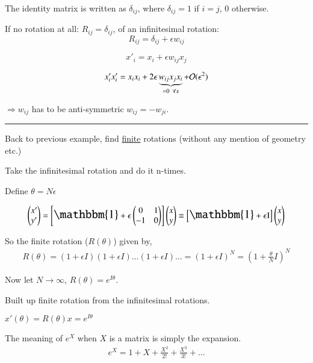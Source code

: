 {The identity matrix is written as $\delta_{ij}$, where $\delta_{ij} = 1$ if $i=j$, 0 otherwise.

If no rotation at all: $R_{ij} = \delta_{ij}$,  of an infinitesimal rotation:  
\begin{equation*}
R_{ij} = \delta_{ij} + \epsilon w_{ij}
\end{equation*}

\begin{equation*}
x'_{i} = x_i + \epsilon w_{ij} x_j
\end{equation*}


\begin{equation*}
x'_{i}x'_{i} = x_i x_{i} + 2 \epsilon \underbrace{w_{ij} x_j x_i}_{ =0 \hspace*{0.05in} \forall x }  + \mathcal{O}(\epsilon^2)
\end{equation*}

$\Rightarrow w_{ij}$ has to be anti-symmetric $w_{ij} = - w_{ji}$.

\noindent\rule{\textwidth}{1pt}

Back to previous example, find \underline{finite} rotations (without any mention of geometry etc.)

Take the infinitesimal rotation and do it n-times.

Define $\theta = N\epsilon$

\begin{eqnarray*}
\xyprime = \left[ \mathlarger{\mathlarger{\mathbbm{1}}} + \epsilon   \IMatrix \right]\xy \equiv \left[ \mathlarger{\mathlarger{\mathbbm{1}}} + \epsilon   \textrm{I} \right]\xy
\end{eqnarray*}

So the finite rotation ($R(\theta)$) given by,
\begin{eqnarray*}
R(\theta) = (1 + \epsilon I)(1 + \epsilon I) \dots (1 + \epsilon I) \dots = (1+\epsilon I)^N = \left(1+\frac{\theta}{N}I\right)^N
\end{eqnarray*}

Now let $N\rightarrow \infty$,  $R(\theta) = e^{I\theta}$.

Built up finite rotation from the infinitesimal rotations.
 
$x'(\theta) = R(\theta)x = e^{I\theta}$

The meaning of $e^X$ when $X$ is a matrix is simply the expansion.
\begin{eqnarray*}
e^X = 1 + X + \frac{X^2}{2!} + \frac{X^3}{3!} + \dots
\end{eqnarray*}


}
